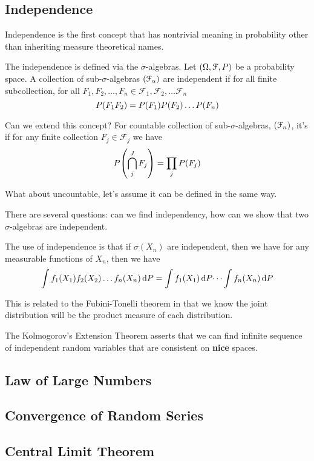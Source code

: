 \subsection{Independence}

Independence is the first concept that has nontrivial meaning in probability other than inheriting measure theoretical names. 

The independence is defined via the \(\sigma\)-algebras. Let \(\pqty{\Omega, \mathcal{F}, P}\) be a probability space. A collection of sub-\(\sigma\)-algebras \(\pqty{\mathcal{F}_{\alpha}}\) are independent if for all finite subcollection, for all \(F_{1}, F_{2}, \dots, F_{n} \in\mathcal{F}_{1}, \mathcal{F}_{2}, \dots \mathcal{F}_{n}\)
\begin{equation*}
    P\pqty{F_{1} F_{2}} = P(F_{1}) P(F_{2}) \dots P \pqty{F_{n}}
\end{equation*}

Can we extend this concept? For countable collection of sub-\(\sigma\)-algebras, \(\pqty{\mathcal{F}_{n}}\), it's  if for any finite collection \(F_{j} \in \mathcal{F}_{j}\) we have 
\begin{equation*}
    P\pqty{\cap_{j}^{J} F_{j}} = \prod_{j} P \pqty{F_{j}}
\end{equation*}

What about uncountable, let's assume it can be defined in the same way. 

There are several questions: can we find independency, how can we show that two \(\sigma\)-algebras are independent. 

The use of independence is that if \(\sigma(X_{n})\) are independent, then we have for any measurable functions of \(X_{n}\), then we have 
\begin{equation*}
    \int f_{1}\pqty{X_{1}} f_{2}\pqty{X_{2}} \dots f_{n}\pqty{X_{n}} \dd{P} = \int f_{1}\pqty{X_{1}} \dd{P} \dots \int f_{n}\pqty{X_{n}} \dd{P}
\end{equation*}

This is related to the Fubini-Tonelli theorem in that we know the joint distribution will be the product measure of each distribution.

The Kolmogorov's Extension Theorem asserts that we can find infinite sequence of independent random variables that are consistent on \textbf{nice} spaces. 


\subsection{Law of Large Numbers}

\subsection{Convergence of Random Series}

\subsection{Central Limit Theorem}